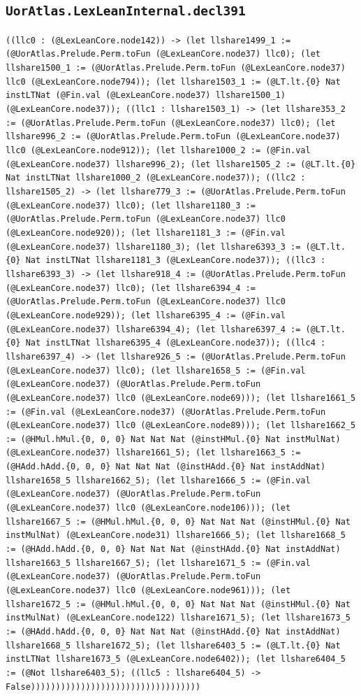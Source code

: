 \documentclass[11pt]{article}
\begin{document}
\subsection*{\texttt{UorAtlas.LexLeanInternal.decl391}}
\noindent\texttt{((llc0 : (@LexLeanCore.node142)) -> (let llshare1499\_1 := (@UorAtlas.Prelude.Perm.toFun (@LexLeanCore.node37) llc0); (let llshare1500\_1 := (@UorAtlas.Prelude.Perm.toFun (@LexLeanCore.node37) llc0 (@LexLeanCore.node794)); (let llshare1503\_1 := (@LT.lt.\{0\} Nat instLTNat (@Fin.val (@LexLeanCore.node37) llshare1500\_1) (@LexLeanCore.node37)); ((llc1 : llshare1503\_1) -> (let llshare353\_2 := (@UorAtlas.Prelude.Perm.toFun (@LexLeanCore.node37) llc0); (let llshare996\_2 := (@UorAtlas.Prelude.Perm.toFun (@LexLeanCore.node37) llc0 (@LexLeanCore.node912)); (let llshare1000\_2 := (@Fin.val (@LexLeanCore.node37) llshare996\_2); (let llshare1505\_2 := (@LT.lt.\{0\} Nat instLTNat llshare1000\_2 (@LexLeanCore.node37)); ((llc2 : llshare1505\_2) -> (let llshare779\_3 := (@UorAtlas.Prelude.Perm.toFun (@LexLeanCore.node37) llc0); (let llshare1180\_3 := (@UorAtlas.Prelude.Perm.toFun (@LexLeanCore.node37) llc0 (@LexLeanCore.node920)); (let llshare1181\_3 := (@Fin.val (@LexLeanCore.node37) llshare1180\_3); (let llshare6393\_3 := (@LT.lt.\{0\} Nat instLTNat llshare1181\_3 (@LexLeanCore.node37)); ((llc3 : llshare6393\_3) -> (let llshare918\_4 := (@UorAtlas.Prelude.Perm.toFun (@LexLeanCore.node37) llc0); (let llshare6394\_4 := (@UorAtlas.Prelude.Perm.toFun (@LexLeanCore.node37) llc0 (@LexLeanCore.node929)); (let llshare6395\_4 := (@Fin.val (@LexLeanCore.node37) llshare6394\_4); (let llshare6397\_4 := (@LT.lt.\{0\} Nat instLTNat llshare6395\_4 (@LexLeanCore.node37)); ((llc4 : llshare6397\_4) -> (let llshare926\_5 := (@UorAtlas.Prelude.Perm.toFun (@LexLeanCore.node37) llc0); (let llshare1658\_5 := (@Fin.val (@LexLeanCore.node37) (@UorAtlas.Prelude.Perm.toFun (@LexLeanCore.node37) llc0 (@LexLeanCore.node69))); (let llshare1661\_5 := (@Fin.val (@LexLeanCore.node37) (@UorAtlas.Prelude.Perm.toFun (@LexLeanCore.node37) llc0 (@LexLeanCore.node89))); (let llshare1662\_5 := (@HMul.hMul.\{0, 0, 0\} Nat Nat Nat (@instHMul.\{0\} Nat instMulNat) (@LexLeanCore.node37) llshare1661\_5); (let llshare1663\_5 := (@HAdd.hAdd.\{0, 0, 0\} Nat Nat Nat (@instHAdd.\{0\} Nat instAddNat) llshare1658\_5 llshare1662\_5); (let llshare1666\_5 := (@Fin.val (@LexLeanCore.node37) (@UorAtlas.Prelude.Perm.toFun (@LexLeanCore.node37) llc0 (@LexLeanCore.node106))); (let llshare1667\_5 := (@HMul.hMul.\{0, 0, 0\} Nat Nat Nat (@instHMul.\{0\} Nat instMulNat) (@LexLeanCore.node31) llshare1666\_5); (let llshare1668\_5 := (@HAdd.hAdd.\{0, 0, 0\} Nat Nat Nat (@instHAdd.\{0\} Nat instAddNat) llshare1663\_5 llshare1667\_5); (let llshare1671\_5 := (@Fin.val (@LexLeanCore.node37) (@UorAtlas.Prelude.Perm.toFun (@LexLeanCore.node37) llc0 (@LexLeanCore.node961))); (let llshare1672\_5 := (@HMul.hMul.\{0, 0, 0\} Nat Nat Nat (@instHMul.\{0\} Nat instMulNat) (@LexLeanCore.node122) llshare1671\_5); (let llshare1673\_5 := (@HAdd.hAdd.\{0, 0, 0\} Nat Nat Nat (@instHAdd.\{0\} Nat instAddNat) llshare1668\_5 llshare1672\_5); (let llshare6403\_5 := (@LT.lt.\{0\} Nat instLTNat llshare1673\_5 (@LexLeanCore.node6402)); (let llshare6404\_5 := (@Not llshare6403\_5); ((llc5 : llshare6404\_5) -> False))))))))))))))))))))))))))))))))))}\par
\end{document}
